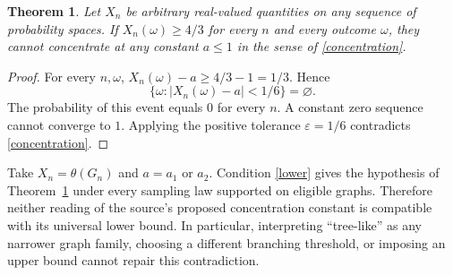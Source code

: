 \documentclass[11pt]{article}
\newtheorem{theorem}{Theorem}
\begin{document}
\begin{theorem}\label{impossibility}
Let $X_n$ be arbitrary real-valued quantities on any sequence of probability spaces. If $X_n(\omega)\geq4/3$ for every $n$ and every outcome $\omega$, they cannot concentrate at any constant $a\leq1$ in the sense of \eqref{concentration}.
\end{theorem}
\begin{proof}
For every $n,\omega$, $X_n(\omega)-a\geq4/3-1=1/3$. Hence
\[
 \bigl\{\omega:|X_n(\omega)-a|<1/6\bigr\}=\varnothing.
\]
The probability of this event equals $0$ for every $n$. A constant zero sequence cannot converge to $1$. Applying the positive tolerance $\varepsilon=1/6$ contradicts \eqref{concentration}.
\end{proof}
Take $X_n=\theta(G_n)$ and $a=a_1$ or $a_2$. Condition \eqref{lower} gives the hypothesis of Theorem~\ref{impossibility} under every sampling law supported on eligible graphs. Therefore neither reading of the source's proposed concentration constant is compatible with its universal lower bound. In particular, interpreting ``tree-like'' as any narrower graph family, choosing a different branching threshold, or imposing an upper bound cannot repair this contradiction.
\end{document}
